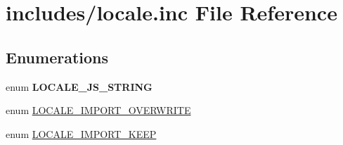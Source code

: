 \hypertarget{locale_8inc}{
\section{includes/locale.inc File Reference}
\label{locale_8inc}
}
\subsection*{Enumerations}
\begin{CompactItemize}
\item 
enum \textbf{LOCALE\_\-JS\_\-STRING} 
\item 
enum \hyperlink{locale_8inc_fd5557a8da0f5c5b4f1965609c9488d5}{LOCALE\_\-IMPORT\_\-OVERWRITE} 
\item 
enum \hyperlink{locale_8inc_303136b14da01d0bdb7088444b3da25e}{LOCALE\_\-IMPORT\_\-KEEP} 
\end{CompactItemize}
